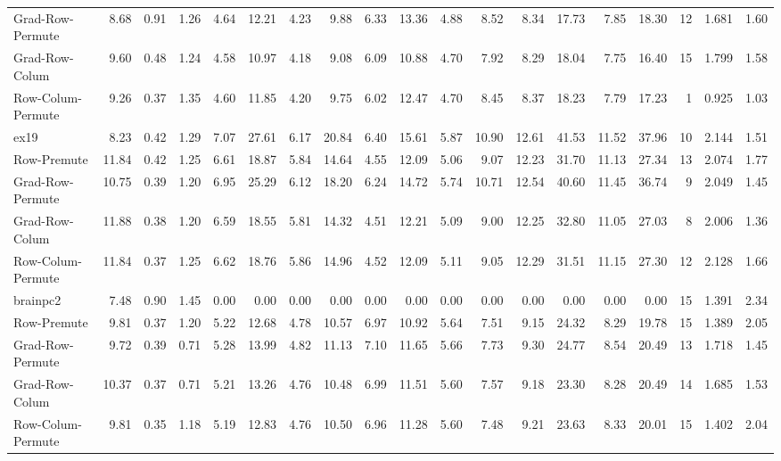 \begin{table}[hbt]
\begin{tabular}{lrrrrrrrrrrrrrrrrrr}
Grad-Row-Permute     & 8.68  &0.91 &  1.26 & 4.64 & 12.21 & 4.23 &  9.88  & 6.33  &13.36  & 4.88  & 8.52  &  8.34  &17.73  & 7.85  &18.30  &12  &1.681   &1.60  \\       
Grad-Row-Colum       & 9.60  &0.48 &  1.24 & 4.58 & 10.97 & 4.18 &  9.08  & 6.09  &10.88  & 4.70  & 7.92  &  8.29  &18.04  & 7.75  &16.40  &15  &1.799   &1.58  \\       
Row-Colum-Permute    & 9.26  &0.37 &  1.35 & 4.60 & 11.85 & 4.20 &  9.75  & 6.02  &12.47  & 4.70  & 8.45  &  8.37  &18.23  & 7.79  &17.23  & 1  &0.925   &1.03  \\ \hline
ex19                 & 8.23  &0.42 &  1.29 & 7.07 & 27.61 & 6.17 & 20.84  & 6.40  &15.61  & 5.87  &10.90  & 12.61  &41.53  &11.52  &37.96  &10  &2.144   &1.51  \\       
Row-Premute          &11.84  &0.42 &  1.25 & 6.61 & 18.87 & 5.84 & 14.64  & 4.55  &12.09  & 5.06  & 9.07  & 12.23  &31.70  &11.13  &27.34  &13  &2.074   &1.77  \\       
Grad-Row-Permute     &10.75  &0.39 &  1.20 & 6.95 & 25.29 & 6.12 & 18.20  & 6.24  &14.72  & 5.74  &10.71  & 12.54  &40.60  &11.45  &36.74  & 9  &2.049   &1.45  \\       
Grad-Row-Colum       &11.88  &0.38 &  1.20 & 6.59 & 18.55 & 5.81 & 14.32  & 4.51  &12.21  & 5.09  & 9.00  & 12.25  &32.80  &11.05  &27.03  & 8  &2.006   &1.36  \\       
Row-Colum-Permute    &11.84  &0.37 &  1.25 & 6.62 & 18.76 & 5.86 & 14.96  & 4.52  &12.09  & 5.11  & 9.05  & 12.29  &31.51  &11.15  &27.30  &12  &2.128   &1.66  \\ \hline
brainpc2             & 7.48  &0.90 &  1.45 & 0.00 &  0.00 & 0.00 &  0.00  & 0.00  & 0.00  & 0.00  & 0.00  &  0.00  & 0.00  & 0.00  & 0.00  &15  &1.391   &2.34  \\       
Row-Premute          & 9.81  &0.37 &  1.20 & 5.22 & 12.68 & 4.78 & 10.57  & 6.97  &10.92  & 5.64  & 7.51  &  9.15  &24.32  & 8.29  &19.78  &15  &1.389   &2.05  \\       
Grad-Row-Permute     & 9.72  &0.39 &  0.71 & 5.28 & 13.99 & 4.82 & 11.13  & 7.10  &11.65  & 5.66  & 7.73  &  9.30  &24.77  & 8.54  &20.49  &13  &1.718   &1.45  \\       
Grad-Row-Colum       &10.37  &0.37 &  0.71 & 5.21 & 13.26 & 4.76 & 10.48  & 6.99  &11.51  & 5.60  & 7.57  &  9.18  &23.30  & 8.28  &20.49  &14  &1.685   &1.53  \\       
Row-Colum-Permute    & 9.81  &0.35 &  1.18 & 5.19 & 12.83 & 4.76 & 10.50  & 6.96  &11.28  & 5.60  & 7.48  &  9.21  &23.63  & 8.33  &20.01  &15  &1.402   &2.04  \\ \hline

\end{tabular}
\end{table}
